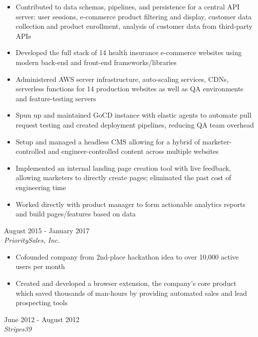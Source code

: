 \documentclass{resume}
\begin{document}
\begin{spacing}{1.2}
\begin{paracol}{2}
		\nointerlineskip
		\begin{itemize}
			\item Contributed to data schemas, pipelines, and persistence for a central API server: user sessions, e-commerce product filtering and display, customer data collection and product enrollment, analysis of customer data from third-party APIs
			\item Developed the full stack of 14 health insurance e-commerce websites using modern back-end and front-end frameworks/libraries
			\item Administered AWS server infrastructure, auto-scaling services, CDNs, serverless functions for 14 production websites as well as QA environments and feature-testing servers
			\item Spun up and maintained GoCD instance with elastic agents to automate pull request testing and created deployment pipelines, reducing QA team overhead
			\item Setup and managed a headless CMS allowing for a hybrid of marketer-controlled and engineer-controlled content across multiple websites
			\item Implemented an internal landing page creation tool with live feedback, allowing marketers to directly create pages; eliminated the past cost of engineering time
			\item Worked directly with product manager to form actionable analytics reports and build pages/features based on data
		\end{itemize}

		\medskip

		{\large{}}
		\hfill{\color{subcontent} August 2015 - January 2017}\\
		\textit{PrioritySales, Inc.}

		\nointerlineskip
		\begin{itemize}
			\item Cofounded company from 2nd-place hackathon idea to over 10,000 active users per month
			\item Created and developed a browser extension, the company’s core product which saved thousands of man-hours by providing automated sales and lead prospecting tools
		\end{itemize}

		\medskip

		{\large{}}
		\hfill{\color{subcontent} June 2012 - August 2012}\\
		\textit{Stripes39}


\end{paracol}
\end{spacing}
\end{document}
